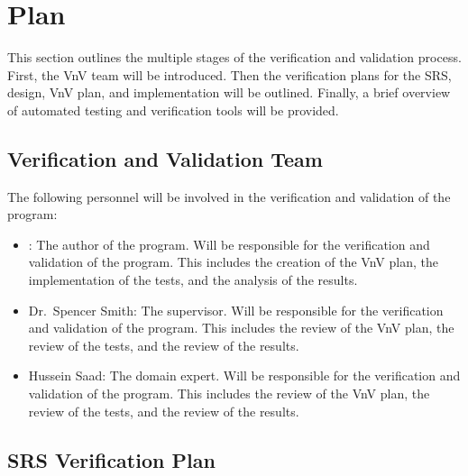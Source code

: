 \documentclass[12pt, titlepage]{article}
\begin{document}

\section{Plan}

This section outlines the multiple stages of the verification and validation
process. First, the VnV team will be introduced. Then the verification plans for
the SRS, design, VnV plan, and implementation will be outlined. Finally, a brief
overview of automated testing and verification tools will be provided. 


\subsection{Verification and Validation Team}


The following personnel will be involved in the verification and validation of
the \progname{} program:

\begin{itemize}
  \item \authname: The author of the program. Will be responsible for the
  verification and validation of the \progname{} program. This includes the creation
  of the VnV plan, the implementation of the tests, and the analysis of the
  results.
  \item Dr.~Spencer Smith: The supervisor. Will be responsible for the
  verification and validation of the \progname{} program. This includes the review
  of the VnV plan, the review of the tests, and the review of the results.
  \item Hussein Saad: The domain expert. Will be responsible for the
  verification and validation of the \progname{} program. This includes the review
  of the VnV plan, the review of the tests, and the review of the results.
\end{itemize}

\subsection{SRS Verification Plan}
\end{document}

